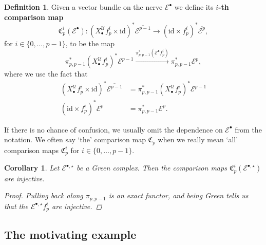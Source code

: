 \documentclass[11pt,fleqn]{article}
\theoremstyle{plain}
\newtheorem{corollary}[theorem]{Corollary}
\theoremstyle{definition}
\newtheorem{definition}[theorem]{Definition}
\theoremstyle{remark}
\numberwithin{equation}{theorem}
\newcommand{\cover}{\mathcal{U}}
\newcommand{\anotherbullet}{\star}
\newcommand{\id}{\mathrm{id}}
\newcommand{\define}[1]{\textbf{#1}}
\newcommand{\nerve}[1]{X_{#1}^\cover}
\newcommand{\comparison}[1]{\mathfrak{C}_{#1}}
\begin{document}
        \begin{definition}\label{definition:comparison-map}
            Given a vector bundle on the nerve $\mathcal{E}^\bullet$ we define its \define{$i$-th comparison map}
            \[
                \comparison{p}^i(\mathcal{E}^\bullet)
                \colon
                \left(\nerve{\bullet} f_p^i\times\id\right)^*\overline{\mathcal{E}^{p-1}}
                \longrightarrow
                \left(\id\times f_p^i\right)^*\overline{\mathcal{E}^p},
            \]
            for $i\in\{0,\ldots,p-1\}$, to be the map
            \[
                \pi_{p,p-1}^*\left(\nerve{\bullet} f_p^i\right)^*\mathcal{E}^{p-1}
                \xrightarrow{\pi_{p,p-1}^*\left( \mathcal{E}^\bullet f_p^i \right)}
                \pi_{p,p-1}^*\mathcal{E}^p,
            \]
            where we use the fact that
            \begin{align*}
                \left(\nerve{\bullet} f_p^i\times\id\right)^*\overline{\mathcal{E}^{p-1}}
            &   =
                \pi_{p,p-1}^*\left(\nerve{\bullet} f_p^i\right)^*\mathcal{E}^{p-1}
            \\  \left(\id\times f_p^i\right)^*\overline{\mathcal{E}^p}
            &   =
                \pi_{p,p-1}^*\mathcal{E}^p.
            \end{align*}

            If there is no chance of confusion, we usually omit the dependence on $\mathcal{E}^\bullet$ from the notation.
            We often say `the' comparison map $\comparison{p}$ when we really mean `all' comparison maps $\comparison{p}^i$ for $i\in\{0,\ldots,p-1\}$.
        \end{definition}

        \begin{corollary}\label{corollary:Green-has-injective-comparisons}
            Let $\mathcal{E}^{\bullet,\anotherbullet}$ be a Gre{}en complex.
            Then the comparison maps $\comparison{p}^i(\mathcal{E}^{\bullet,\anotherbullet})$ are injective.

            \begin{proof}
                Pulling back along $\pi_{p,p-1}$ is an exact functor, and being Gre{}en tells us that the $\mathcal{E}^{\bullet,\anotherbullet} f_p^i$ are injective.
            \end{proof}
        \end{corollary}


    \subsection{The motivating example}\label{subsection:the-motivating-example}
\end{document}
